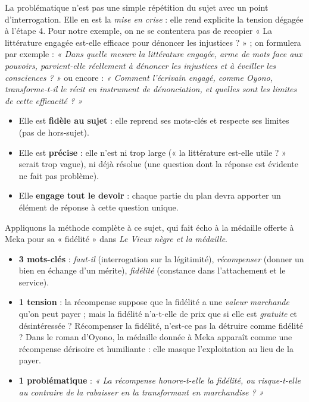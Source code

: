 \documentclass[11pt]{article}
\begin{document}
La problématique n'est pas une simple répétition du sujet avec un point d'interrogation. Elle en est la \emph{mise en crise} : elle rend explicite la tension dégagée à l'étape 4. Pour notre exemple, on ne se contentera pas de recopier « La littérature engagée est-elle efficace pour dénoncer les injustices ? » ; on formulera par exemple : \emph{« Dans quelle mesure la littérature engagée, arme de mots face aux pouvoirs, parvient-elle réellement à dénoncer les injustices et à éveiller les consciences ? »} ou encore : \emph{« Comment l'écrivain engagé, comme Oyono, transforme-t-il le récit en instrument de dénonciation, et quelles sont les limites de cette efficacité ? »}

\begin{aretenir}
\begin{itemize}
\item Elle est \textbf{fidèle au sujet} : elle reprend ses mots-clés et respecte ses limites (pas de hors-sujet).
\item Elle est \textbf{précise} : elle n'est ni trop large (« la littérature est-elle utile ? » serait trop vague), ni déjà résolue (une question dont la réponse est évidente ne fait pas problème).
\item Elle \textbf{engage tout le devoir} : chaque partie du plan devra apporter un élément de réponse à cette question unique.
\end{itemize}
\end{aretenir}

\begin{exemplebox}
Appliquons la méthode complète à ce sujet, qui fait écho à la médaille offerte à Meka pour sa « fidélité » dans \emph{Le Vieux nègre et la médaille}.
\begin{itemize}
\item \textbf{3 mots-clés} : \emph{faut-il} (interrogation sur la légitimité), \emph{récompenser} (donner un bien en échange d'un mérite), \emph{fidélité} (constance dans l'attachement et le service).
\item \textbf{1 tension} : la récompense suppose que la fidélité a une \emph{valeur marchande} qu'on peut payer ; mais la fidélité n'a-t-elle de prix que si elle est \emph{gratuite} et désintéressée ? Récompenser la fidélité, n'est-ce pas la détruire comme fidélité ? Dans le roman d'Oyono, la médaille donnée à Meka apparaît comme une récompense dérisoire et humiliante : elle masque l'exploitation au lieu de la payer.
\item \textbf{1 problématique} : \emph{« La récompense honore-t-elle la fidélité, ou risque-t-elle au contraire de la rabaisser en la transformant en marchandise ? »}
\end{itemize}
\end{exemplebox}
\end{document}
